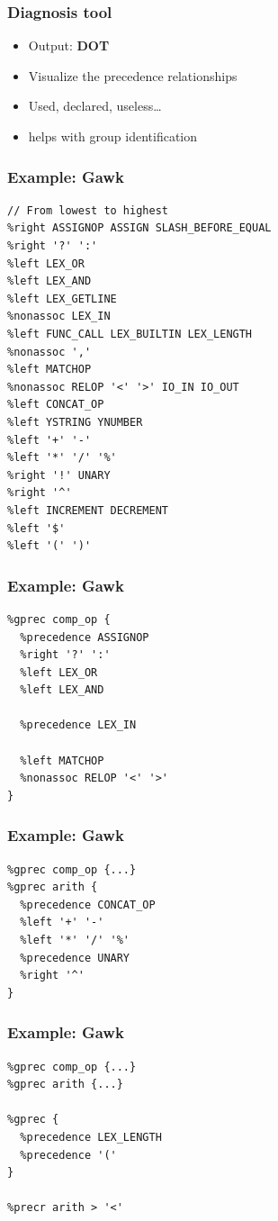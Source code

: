 \documentclass{beamer}
\begin{document}
\begin{frame}
  \frametitle{Diagnosis tool}
    \begin{itemize}
      \item Output: \textbf{DOT}
      \item Visualize the precedence relationships
      \item Used, declared, useless\ldots
      \item helps with group identification
    \end{itemize}
\end{frame}

\begin{frame}[fragile]
  \frametitle{Example: Gawk}
  \footnotesize{%
  \begin{verbatim}
// From lowest to highest
%right ASSIGNOP ASSIGN SLASH_BEFORE_EQUAL
%right '?' ':'
%left LEX_OR
%left LEX_AND
%left LEX_GETLINE
%nonassoc LEX_IN
%left FUNC_CALL LEX_BUILTIN LEX_LENGTH
%nonassoc ','
%left MATCHOP
%nonassoc RELOP '<' '>' IO_IN IO_OUT
%left CONCAT_OP
%left YSTRING YNUMBER
%left '+' '-'
%left '*' '/' '%'
%right '!' UNARY
%right '^'
%left INCREMENT DECREMENT
%left '$'
%left '(' ')'
\end{verbatim}
}
\end{frame}


\begin{frame}[fragile]
  \frametitle{Example: Gawk}
\begin{verbatim}
%gprec comp_op {
  %precedence ASSIGNOP
  %right '?' ':'
  %left LEX_OR
  %left LEX_AND

  %precedence LEX_IN

  %left MATCHOP
  %nonassoc RELOP '<' '>'
}

\end{verbatim}
\end{frame}

\begin{frame}[fragile]
  \frametitle{Example: Gawk}
\begin{verbatim}
%gprec comp_op {...}
%gprec arith {
  %precedence CONCAT_OP
  %left '+' '-'
  %left '*' '/' '%'
  %precedence UNARY
  %right '^'
}
\end{verbatim}
\end{frame}

\begin{frame}[fragile]
  \frametitle{Example: Gawk}
\begin{verbatim}
%gprec comp_op {...}
%gprec arith {...}

%gprec {
  %precedence LEX_LENGTH
  %precedence '('
}

%precr arith > '<'
\end{verbatim}
\end{frame}
\end{document}
